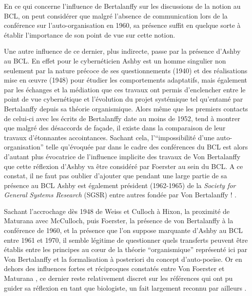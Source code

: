 En ce qui concerne l'influence de Bertalanffy sur les discussions de la notion au BCL, on peut considérer que malgré l'absence de communication lors de la conférence sur l'auto-organisation en 1960, sa présence suffit en quelque sorte à établir l'importance de son point de vue sur cette notion.

Une autre influence de ce dernier, plus indirecte, passe par la présence d'Ashby au BCL. En effet pour \autocite[791]{Pouvreau2013} le cybernéticien Ashby est un homme singulier non seulement par la nature précoce de ses questionnements (1940) et des réalisations mise en œuvre (1948) pour étudier les comportements adaptatifs, mais également par les échanges et la médiation que ces travaux ont permis d'enclencher entre le point de vue cybernétique et l'évolution du projet systémique tel qu'entamé par Bertalanffy depuis sa théorie organismique. Alors même que les premiers contacts de celui-ci avec les écrits de Bertalanffy date au moins de 1952, \textcite[793]{Pouvreau2013} tend à montrer que malgré des désaccords de façade, il existe dans la comparaison de leur travaux d'étonnantes accointances. Sachant cela, l'\enquote{impossibilité d'une auto-organisation} telle qu'évoquée par \textcite{Ashby1962}  dans le cadre des conférences du BCL est alors d'autant plus évocatrice de l'influence implicite des travaux de Von Bertalanffy que cette réflexion d'Ashby va être considéré par Foerster au sein du BCL. A ce constat, il ne faut pas oublier d'ajouter que pendant une large partie de sa présence au BCL Ashby est également président (1962-1965) de la \textit{Society for General Systems Research} (SGSR) entre autres fondée par Von Bertalanffy ! \autocite[826]{Pouvreau2013}.

Sachant l'accrochage dès 1948 de Weiss et Culloch à Hixon, la proximité de Maturana avec McCulloch, puis Foerster, la présence de von Bertalanffy à la conférence de 1960, et la présence que l'on suppose marquante d'Ashby au BCL entre 1961 et 1970, il semble légitime de questionner quels transferts peuvent être établis entre les principes au cœur de la théorie \enquote{organismique} représenté ici par Von Bertalanffy et la formalisation à posteriori du concept d'auto-poeïse. Or en dehors des influences fortes et réciproques constatés entre Von Foerster et Maturana \autocites{Muller2007b}[255-273]{CREA1985}, ce dernier reste relativement discret sur les références qui ont pu guider sa réflexion en tant que biologiste, un fait largement reconnu par ailleurs \autocite[161]{Pangaro2007}.  

